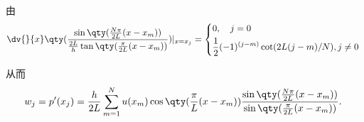 由
\begin{equation}
\dv{}{x}\qty(\frac{\sin\qty(\frac{N\pi}{2L}(x-x_m))}{\frac{2L}{h}\tan\qty(\frac{\pi}{2L}(x-x_m))})|_{x=x_j}=\left\{\begin{aligned}
&0,\quad j=0\\
&\frac{1}{2}(-1)^{(j-m)}\cot(2L(j-m)/N),j\neq0
\end{aligned}\right.~
\end{equation}

从而
\begin{equation}
\begin{aligned}
w_j=p'(x_j)=\frac{h}{2L}\sum_{m=1}^{N}u(x_m)\cos\qty(\frac{\pi}{L}(x-x_m))\frac{\sin\qty(\frac{N\pi}{2L}(x-x_m))}{\sin\qty(\frac{\pi}{2L}(x-x_m))}.
\end{aligned}~
\end{equation}






































